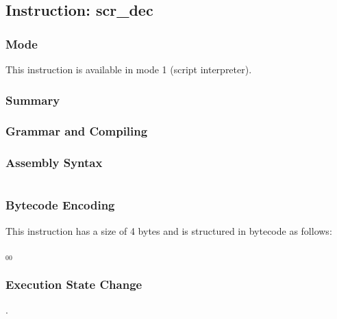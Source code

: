 \subsection{Instruction: scr\_dec}

\subsubsection{Mode}
This instruction is available in mode 1 (script interpreter).
\subsubsection{Summary}


\subsubsection{Grammar and Compiling}


\subsubsection{Assembly Syntax}

\begin{myquote}
\begin{verbatim}

\end{verbatim}
\end{myquote}

\subsubsection{Bytecode Encoding}

This instruction has a size of 4 bytes and is structured in bytecode as follows:

$_{00}$\ 

\subsubsection{Execution State Change}

.


